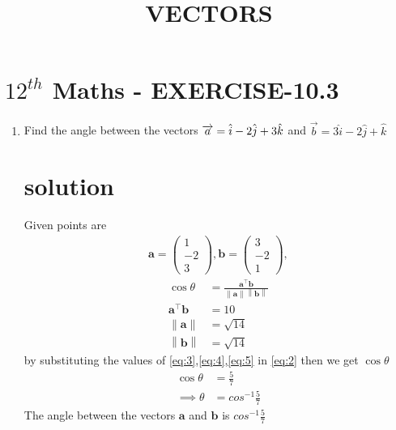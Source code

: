 \documentclass[journal,12pt]{article}
\newcommand{\myvec}[1]{\ensuremath{\begin{pmatrix}#1\end{pmatrix}}}
\providecommand{\norm}[1]{\left\lVert#1\right\rVert}
\let\vec\mathbf
\begin{document}
\begin{center}
\title{\textbf{VECTORS}}
\date{\vspace{-5ex}} %
\maketitle
\end{center}

\section*{$12^{th}$ Maths - EXERCISE-10.3}

\begin{enumerate}
\item Find the angle between the vectors $\\ \overrightarrow{a}=\hat{i}-2\hat{j}+3\hat{k}$ and $\overrightarrow{b}=3\hat{i}-2\hat{j}+\hat{k}$  
\section*{solution}
Given points are
\begin{align}
\vec{a} = \myvec{1\\-2\\3} , \vec{b} = \myvec{3\\ -2 \\ 1},
\end{align}
\begin{align}
\cos\theta&=\frac{\vec{a}^{\top}\vec{b}}{\norm{\vec{a}}\norm{\vec{b}}}\label{eq:2}\\
\vec{a}^{\top}\vec{b}&=10 \label{eq:3} \\
\norm{\vec{a}}&=\sqrt{14} \label{eq:4}\\
\norm{\vec{b}}&=\sqrt{14}
\label{eq:5}
\end{align}
		by substituting the values of \eqref{eq:3},\eqref{eq:4},\eqref{eq:5} in \eqref{eq:2} then  we get $\cos\theta$
\begin{align}
	\cos\theta &= \frac{5}{7}\\
	\implies \theta&= cos^{-1}\frac{5}{7}
\end{align}
 The angle between the vectors $\vec{a}$ and $\vec{b}$ is $cos^{-1}\frac{5}{7}$
\end{enumerate}
\end{document}
